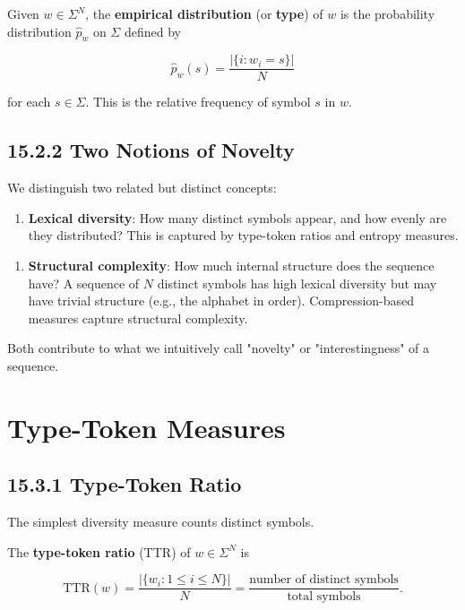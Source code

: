 \begin{definition}
Given $w \in \Sigma^N$, the \textbf{empirical distribution} (or \textbf{type}) of $w$ is the probability distribution $\hat{p}_w$ on $\Sigma$ defined by

\[\hat{p}_w(s) = \frac{|\{i : w_i = s\}|}{N}\]

for each $s \in \Sigma$. This is the relative frequency of symbol $s$ in $w$.
\end{definition}

\subsection{15.2.2 Two Notions of Novelty}

We distinguish two related but distinct concepts:

\begin{enumerate}
\item \textbf{Lexical diversity}: How many distinct symbols appear, and how evenly are they distributed? This is captured by type-token ratios and entropy measures.
\end{enumerate}

\begin{enumerate}
\item \textbf{Structural complexity}: How much internal structure does the sequence have? A sequence of $N$ distinct symbols has high lexical diversity but may have trivial structure (e.g., the alphabet in order). Compression-based measures capture structural complexity.
\end{enumerate}

Both contribute to what we intuitively call "novelty" or "interestingness" of a sequence.



\section{Type-Token Measures}

\subsection{15.3.1 Type-Token Ratio}

The simplest diversity measure counts distinct symbols.

\begin{definition}
The \textbf{type-token ratio} (TTR) of $w \in \Sigma^N$ is

\[\mathrm{TTR}(w) = \frac{|\{w_i : 1 \leq i \leq N\}|}{N} = \frac{\text{number of distinct symbols}}{\text{total symbols}}.\]
\end{definition}

